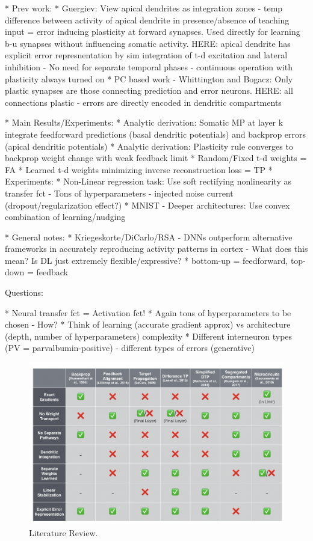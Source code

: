 \documentclass{article}
\theoremstyle{definition}
\begin{document}
* Prev work:
    * Guergiev: View apical dendrites as integration zones - temp difference between activity of apical dendrite in presence/absence of teaching input = error inducing plasticity at forward synapses. Used directly for learning b-u synapses without influencing somatic activity. HERE: apical dendrite has explicit error represnentation by sim integration of t-d excitation and lateral inhibition - No need for separate temporal phases - continuous operation with plasticity always turned on
    * PC based work - Whittington and Bogacz: Only plastic synapses are those connecting prediction and error neurons. HERE: all connections plastic - errors are directly encoded in dendritic compartments

* Main Results/Experiments:
    * Analytic derivation: Somatic MP at layer k integrate feedforward predictions (basal dendritic potentials) and backprop errors (apical dendritic potentials)
    * Analytic derivation: Plasticity rule converges to backprop weight change with weak feedback limit
    * Random/Fixed t-d weights = FA
    * Learned t-d weights minimizing inverse reconstruction loss = TP
    * Experiments:
        * Non-Linear regression task: Use soft rectifying nonlinearity as transfer fct - Tons of hyperparameters - injected noise current (dropout/regularization effect?)
        * MNIST - Deeper architectures: Use convex combination of learning/nudging

* General notes:
    * Kriegeskorte/DiCarlo/RSA - DNNs outperform alternative frameworks in accurately reproducing activity patterns in cortex - What does this mean? Is DL just extremely flexible/expressive?
    * bottom-up = feedforward, top-down = feedback


Questions:

* Neural transfer fct = Activation fct!
* Again tons of hyperparameters to be chosen - How?
* Think of learning (accurate gradient approx) vs architecture (depth, number of hyperparameters) complexity
* Different interneuron types (PV = parvalbumin-positive) - different types of errors (generative)

\begin{figure}[H]
	\centering
	\includegraphics[width=\textwidth]{../figures/report/lit_rev}
	\caption{Literature Review.}	
\end{figure}
\end{document}
